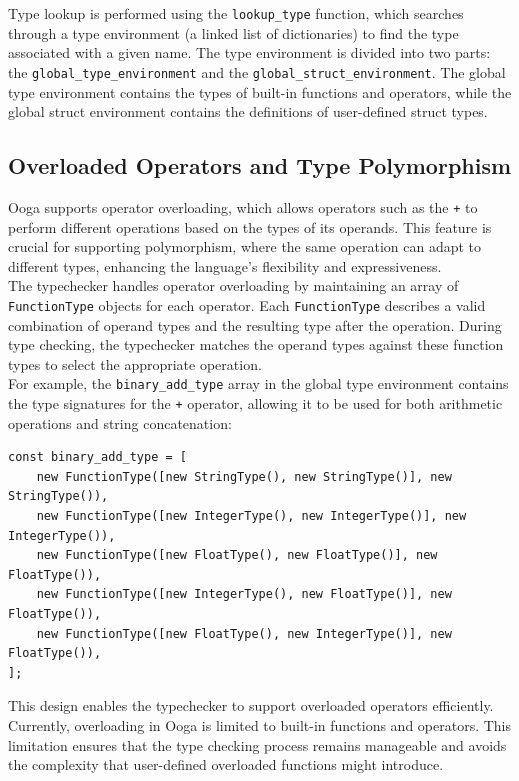 \documentclass{report}
\begin{document}
Type lookup is performed using the \texttt{lookup\_type} function, which searches through a type environment (a linked list of dictionaries) to find the type associated with a given name. The type environment is divided into two parts: the \texttt{global\_type\_environment} and the \texttt{global\_struct\_environment}. The global type environment contains the types of built-in functions and operators, while the global struct environment contains the definitions of user-defined struct types.\\


\subsection{Overloaded Operators and Type Polymorphism}\label{section:typechecker-operators}

Ooga supports operator overloading, which allows operators such as the \texttt{+} to perform different operations based on the types of its operands. This feature is crucial for supporting polymorphism, where the same operation can adapt to different types, enhancing the language's flexibility and expressiveness.\\

The typechecker handles operator overloading by maintaining an array of \texttt{FunctionType} objects for each operator. Each \texttt{FunctionType} describes a valid combination of operand types and the resulting type after the operation. During type checking, the typechecker matches the operand types against these function types to select the appropriate operation.\\

For example, the \texttt{binary\_add\_type} array in the global type environment contains the type signatures for the \texttt{+} operator, allowing it to be used for both arithmetic operations and string concatenation:

\begin{verbatim}
const binary_add_type = [
    new FunctionType([new StringType(), new StringType()], new StringType()),
    new FunctionType([new IntegerType(), new IntegerType()], new IntegerType()),
    new FunctionType([new FloatType(), new FloatType()], new FloatType()),
    new FunctionType([new IntegerType(), new FloatType()], new FloatType()),
    new FunctionType([new FloatType(), new IntegerType()], new FloatType()),
];
\end{verbatim}

This design enables the typechecker to support overloaded operators efficiently. Currently, overloading in Ooga is limited to built-in functions and operators. This limitation ensures that the type checking process remains manageable and avoids the complexity that user-defined overloaded functions might introduce.
\end{document}
